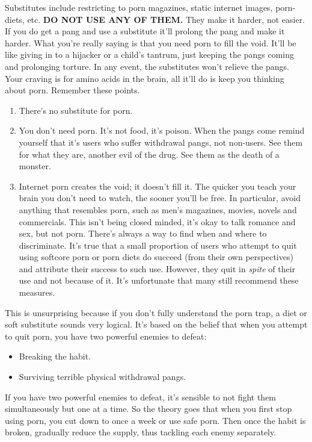 \documentclass[easypeasy.tex]{subfiles}
\begin{document}
Substitutes include restricting to porn magazines, static internet images, porn-diets, etc. \textbf{DO NOT USE ANY OF THEM.} They make it harder, not easier. If you do get a pang and use a substitute it'll prolong the pang and make it harder. What you're really saying is that you need porn to fill the void. It'll be like giving in to a hijacker or a child's tantrum, just keeping the pangs coming and prolonging torture. In any event, the substitutes won't relieve the pangs. Your craving is for amino acids in the brain, all it'll do is keep you thinking about porn. Remember these points.
\begin{enumerate}
  \item There's no substitute for porn.
  \item You don't need porn. It's not food, it's poison. When the pangs come remind yourself that it's users who suffer withdrawal pangs, not non-users. See them for what they are, another evil of the drug. See them as the death of a monster.
  \item Internet porn creates the void; it doesn't fill it. The quicker you teach your brain you don't need to watch, the sooner you'll be free. In particular, avoid anything that resembles porn, such as men's magazines, movies, novels and commercials. This isn't being closed minded, it's okay to talk romance and sex, but not porn. There's always a way to find when and where to discriminate. It's true that a small proportion of users who attempt to quit using softcore porn or porn diets do succeed (from their own perspectives) and attribute their success to such use. However, they quit in \textit{spite} of their use and not because of it. It's unfortunate that many still recommend these measures.
\end{enumerate}

This is unsurprising because if you don't fully understand the porn trap, a diet or soft substitute sounds very logical. It's based on the belief that when you attempt to quit porn, you have two powerful enemies to defeat:
\begin{itemize}
  \item Breaking the habit.
  \item Surviving terrible physical withdrawal pangs.
\end{itemize}

If you have two powerful enemies to defeat, it's sensible to not fight them simultaneously but one at a time. So the theory goes that when you first stop using porn, you cut down to once a week or use safe porn. Then once the habit is broken, gradually reduce the supply, thus tackling each enemy separately.
\end{document}
